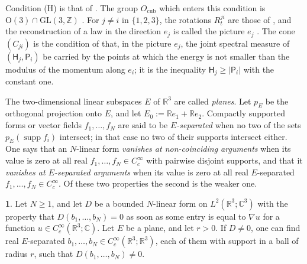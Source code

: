 \documentclass[11pt]{amsart}
\newcommand{\namedhead}{}
\theoremstyle{definition}
\newtheorem*{namedinner}{\namedhead}
\newenvironment{named}[1]{\renewcommand{\namedhead}{#1}\begin{namedinner}}{\end{namedinner}}
\begin{document}
Condition (H) is that of \cite[Notation~(n3)]{QEDIII}.
The group $O_{\mathrm{cub}}$ which enters this condition is $\mathrm{O}(3)\cap\mathrm{GL}(3,\mathbb{Z})$ \cite[Section~I.1.2]{QEDIII}.
For $j\neq i$ in $\{1,2,3\}$, the rotations $R^{ji}_t$ are those of \cite[Definition~14.1]{QEDII}, and the reconstruction of a law in the direction $e_j$ is called the picture $e_j$ \cite[Section~1.2]{QEDII}.
The cone $(C_{ji})$ is the condition of \cite[Definition~14.2\,(c)]{QEDII} that, in the picture $e_j$, the joint spectral measure of $(\mathsf H_j,\mathsf P_i)$ be carried by the points at which the energy is not smaller than the modulus of the momentum along $e_i$; it is the inequality $\mathsf H_j\ge|\mathsf P_i|$ with the constant one.

The two-dimensional linear subspaces $E$ of $\mathbb{R}^3$ are called \emph{planes}.
Let $p_E$ be the orthogonal projection onto $E$, and let $E_0:=\mathbb{R}e_1+\mathbb{R}e_2$.
Compactly supported forms or vector fields $f_1,\dots,f_N$ are said to be \emph{$E$-separated} when no two of the sets $p_E(\operatorname{supp}f_i)$ intersect; in that case no two of their supports intersect either.
One says that an $N$-linear form \emph{vanishes at non-coinciding arguments} when its value is zero at all real $f_1,\dots,f_N\in C_c^\infty$ with pairwise disjoint supports, and that it \emph{vanishes at $E$-separated arguments} when its value is zero at all real $E$-separated $f_1,\dots,f_N\in C_c^\infty$.
Of these two properties the second is the weaker one.
\begin{named}{Lemma 1.1}
Let $N\ge1$, and let $D$ be a bounded $N$-linear form on $L^2(\mathbb{R}^3;\mathbb{C}^3)$ with the property that $D(b_1,\dots,b_N)=0$ as soon as some entry is equal to $\nabla u$ for a function $u\in C_c^\infty(\mathbb{R}^3;\mathbb{C})$.
Let $E$ be a plane, and let $r>0$.
If $D\neq0$, one can find real $E$-separated $b_1,\dots,b_N\in C_c^\infty(\mathbb{R}^3;\mathbb{R}^3)$, each of them with support in a ball of radius $r$, such that $D(b_1,\dots,b_N)\neq0$.
\end{named}
\end{document}
